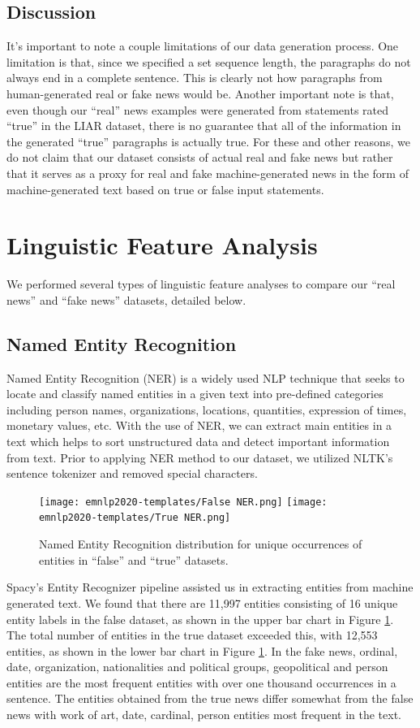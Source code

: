 \documentclass[11pt,a4paper]{article}
\begin{document}
\subsection{Discussion}
It's important to note a couple limitations of our data generation process. One limitation is that, since we specified a set sequence length, the paragraphs do not always end in a complete sentence. This is clearly not how paragraphs from human-generated real or fake news would be. Another important note is that, even though our ``real'' news examples were generated from statements rated ``true'' in the LIAR dataset, there is no guarantee that all of the information in the generated ``true'' paragraphs is actually true. For these and other reasons, we do not claim that our dataset consists of actual real and fake news but rather that it serves as a proxy for real and fake machine-generated news in the form of machine-generated text based on true or false input statements.

\section{Linguistic Feature Analysis}
We performed several types of linguistic feature analyses to compare our ``real news'' and ``fake news'' datasets, detailed below. 

\subsection{Named Entity Recognition}
 Named Entity Recognition (NER) is a widely used NLP technique that seeks to locate and classify named entities in a given text into pre-defined categories including person names, organizations, locations, quantities, expression of times, monetary values, etc. With the use of NER, we can extract main entities in a text which helps to sort unstructured data and detect important information from text. Prior to applying NER method to our dataset, we utilized NLTK's sentence tokenizer and removed special characters. 
 
 \begin{figure}
    \centering
    \texttt{[image: emnlp2020-templates/False NER.png]}
    \texttt{[image: emnlp2020-templates/True NER.png]}
    \caption{Named Entity Recognition distribution for unique occurrences of entities in ``false'' and ``true'' datasets.}
    \label{fig:NER}
\end{figure}
 
 Spacy's Entity Recognizer pipeline assisted us in extracting entities from machine generated text. We found that there are 11,997 entities consisting of 16 unique entity labels in the false dataset, as shown in the upper bar chart in Figure \ref{fig:NER}. The total number of entities in the true dataset exceeded this, with 12,553 entities, as shown in the lower bar chart in Figure \ref{fig:NER}. In the fake news, ordinal, date, organization, nationalities and political groups, geopolitical and person entities are the most frequent entities with over one thousand occurrences in a sentence. The entities obtained from the true news differ somewhat from the false news with work of art, date, cardinal, person entities most frequent in the text. 
 
\end{document}
